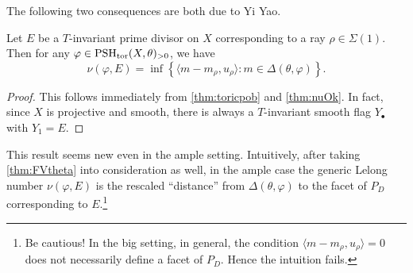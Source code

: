 The following two consequences are both due to Yi Yao.
\begin{corollary}\label{cor:toricLelong}
    Let $E$ be a $T$-invariant prime divisor on $X$ corresponding to a ray $\rho\in \Sigma(1)$. Then for any $\varphi\in \mathrm{PSH}_{\mathrm{tor}}(X,\theta)_{>0}$, we have
    \[
    \nu(\varphi,E)=\inf \left\{ \langle m-m_{\rho},u_{\rho}\rangle : m\in \Delta(\theta,\varphi) \right\}.
    \]
\end{corollary}
\begin{proof}
    This follows immediately from \cref{thm:toricpob} and \cref{thm:nuOk}. In fact, since $X$ is projective and smooth, there is always a $T$-invariant smooth flag $Y_{\bullet}$ with $Y_1=E$.
\end{proof}
This result seems new even in the ample setting. Intuitively, after taking \cref{thm:FVtheta} into consideration as well, in the ample case the generic Lelong number $\nu(\varphi,E)$ is the rescaled ``distance'' from $\Delta(\theta,\varphi)$ to the facet of $P_D$ corresponding to $E$.\footnote{Be cautious! In the big setting, in general, the condition $\langle m-m_{\rho},u_{\rho}\rangle=0$ does not necessarily define a facet of $P_D$. Hence the intuition fails.}

